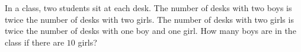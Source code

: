 In a class, two students sit at each desk. The number of desks with two boys is twice the number of desks with two girls. The number of desks with two girls is twice the number of desks with one boy and one girl. How many boys are in the class if there are $10$ girls?
